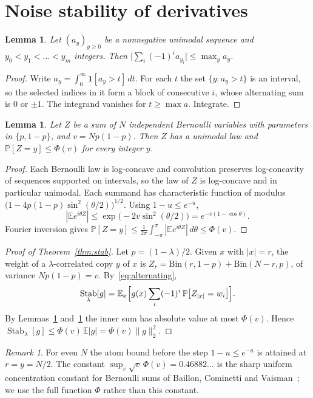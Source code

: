 \documentclass[11pt]{amsart}
\newtheorem{lemma}[theorem]{Lemma}
\theoremstyle{definition}
\theoremstyle{remark}
\newtheorem{remark}[theorem]{Remark}
\newcommand{\E}{\mathbb E}
\renewcommand{\P}{\mathbb P}
\DeclareMathOperator{\Stab}{Stab}
\begin{document}
\section{Noise stability of derivatives}\label{sec:stab}

\begin{lemma}\label{lem:unimodal}
Let $(a_y)_{y\ge0}$ be a nonnegative unimodal sequence and $y_0<y_1<\dots<y_m$ integers. Then $\bigl|\sum_i(-1)^ia_{y_i}\bigr|\le\max_ya_y$.
\end{lemma}

\begin{proof}
Write $a_y=\int_0^\infty\mathbf 1[a_y>t]\,dt$. For each $t$ the set $\{y:a_y>t\}$ is an interval, so the selected indices in it form a block of consecutive $i$, whose alternating sum is $0$ or $\pm1$. The integrand vanishes for $t\ge\max a$. Integrate.
\end{proof}

\begin{lemma}\label{lem:atom}
Let $Z$ be a sum of $N$ independent Bernoulli variables with parameters in $\{p,1-p\}$, and $v=Np(1-p)$. Then $Z$ has a unimodal law and $\P[Z=y]\le\Phi(v)$ for every integer $y$.
\end{lemma}

\begin{proof}
Each Bernoulli law is log-concave and convolution preserves log-concavity of sequences supported on intervals, so the law of $Z$ is log-concave and in particular unimodal. Each summand has characteristic function of modulus $\bigl(1-4p(1-p)\sin^2(\theta/2)\bigr)^{1/2}$. Using $1-u\le e^{-u}$,
\[
 |\E e^{i\theta Z}|\le\exp\bigl(-2v\sin^2(\theta/2)\bigr)=e^{-v(1-\cos\theta)}.
\]
Fourier inversion gives $\P[Z=y]\le\frac1{2\pi}\int_{-\pi}^\pi|\E e^{i\theta Z}|\,d\theta\le\Phi(v)$.
\end{proof}

\begin{proof}[Proof of Theorem~\ref{thm:stab}]
Let $p=(1-\lambda)/2$. Given $x$ with $|x|=r$, the weight of a $\lambda$-correlated copy $y$ of $x$ is $Z_r=\mathrm{Bin}(r,1-p)+\mathrm{Bin}(N-r,p)$, of variance $Np(1-p)=v$. By~\eqref{eq:alternating},
\[
 \Stab_\lambda[g]=\E_x\Bigl[g(x)\sum_i(-1)^i\,\P\bigl[Z_{|x|}=w_i\bigr]\Bigr].
\]
By Lemmas~\ref{lem:unimodal} and~\ref{lem:atom} the inner sum has absolute value at most $\Phi(v)$. Hence $\Stab_\lambda[g]\le\Phi(v)\,\E|g|=\Phi(v)\|g\|_2^2$.
\end{proof}

\begin{remark}
For even $N$ the atom bound before the step $1-u\le e^{-u}$ is attained at $r=y=N/2$. The constant $\sup_v\sqrt v\,\Phi(v)=0.46882\ldots$ is the sharp uniform concentration constant for Bernoulli sums of Baillon, Cominetti and Vaisman~\cite{BCV16}; we use the full function $\Phi$ rather than this constant.
\end{remark}
\end{document}
